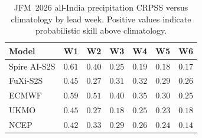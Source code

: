 \begin{table}[t]
  \centering
  \caption{JFM~2026 all-India precipitation CRPSS versus climatology by lead week. Positive values indicate probabilistic skill above climatology.}
  \label{tab:jfm_crpss_tp}
  \small
  \begin{tabular}{lcccccc}
    \toprule
    Model & W1 & W2 & W3 & W4 & W5 & W6 \\
    \midrule
    Spire AI-S2S   & $\mathbf{0.61}$ & $0.40$ & $0.25$ & $0.19$ & $0.18$ & $0.17$ \\
FuXi-S2S       & $0.45$ & $0.27$ & $0.31$ & $0.32$ & $0.29$ & $\mathbf{0.26}$ \\
ECMWF          & $0.59$ & $\mathbf{0.51}$ & $\mathbf{0.40}$ & $\mathbf{0.35}$ & $\mathbf{0.30}$ & $0.25$ \\
UKMO           & $0.45$ & $0.27$ & $0.18$ & $0.25$ & $0.23$ & $0.18$ \\
NCEP           & $0.42$ & $0.33$ & $0.29$ & $0.26$ & $0.24$ & $0.14$ \\
    \bottomrule
  \end{tabular}
\end{table}
